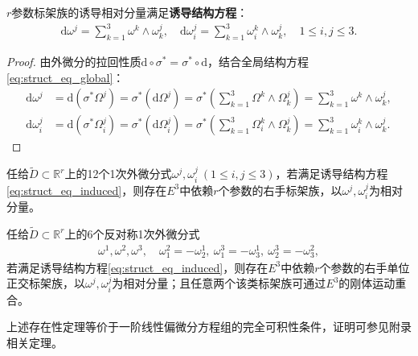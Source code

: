 \documentclass[../../main.tex]{subfiles}%
\begin{document}
\begin{theorem}
$r$参数标架族的诱导相对分量满足\textbf{诱导结构方程}：
\begin{align}
\mathrm{d}\omega^j=\sum\limits_{k=1}^3\omega^k\wedge\omega_k^j,\quad \mathrm{d}\omega_i^j=\sum\limits_{k=1}^3\omega_i^k\wedge\omega_k^j,\quad 1\leqslant i,j\leqslant3.
\label{eq:struct_eq_induced}
\end{align}
\end{theorem}
\begin{proof}

由外微分的拉回性质$\mathrm{d}\circ\sigma^*=\sigma^*\circ\mathrm{d}$，结合全局结构方程\eqref{eq:struct_eq_global}：
\begin{align*}
\mathrm{d}\omega^j&=\mathrm{d}(\sigma^*\Omega^j)=\sigma^*(\mathrm{d}\Omega^j)=\sigma^*\left(\sum\limits_{k=1}^3\Omega^k\wedge\Omega_k^j\right)=\sum\limits_{k=1}^3\omega^k\wedge\omega_k^j,\\
\mathrm{d}\omega_i^j&=\mathrm{d}(\sigma^*\Omega_i^j)=\sigma^*(\mathrm{d}\Omega_i^j)=\sigma^*\left(\sum\limits_{k=1}^3\Omega_i^k\wedge\Omega_k^j\right)=\sum\limits_{k=1}^3\omega_i^k\wedge\omega_k^j.
\end{align*}

\end{proof}

\begin{theorem}
任给$\tilde{D}\subset\mathbb{R}^r$上的12个1次外微分式$\omega^j,\omega_i^j\ (1\leqslant i,j\leqslant3)$，若满足诱导结构方程\eqref{eq:struct_eq_induced}，则存在$E^3$中依赖$r$个参数的右手标架族，以$\omega^j,\omega_i^j$为相对分量。
\end{theorem}

\begin{theorem}
任给$\tilde{D}\subset\mathbb{R}^r$上的6个反对称1次外微分式
\begin{align*}
\omega^1,\omega^2,\omega^3,\quad \omega_1^2=-\omega_2^1,\ \omega_1^3=-\omega_3^1,\ \omega_2^3=-\omega_3^2,
\end{align*}
若满足诱导结构方程\eqref{eq:struct_eq_induced}，则存在$E^3$中依赖$r$个参数的右手单位正交标架族，以$\omega^j,\omega_i^j$为相对分量；且任意两个该类标架族可通过$E^3$的刚体运动重合。
\end{theorem}

\begin{remark}
上述存在性定理等价于一阶线性偏微分方程组的完全可积性条件，证明可参见附录相关定理。
\end{remark}
\end{document}
